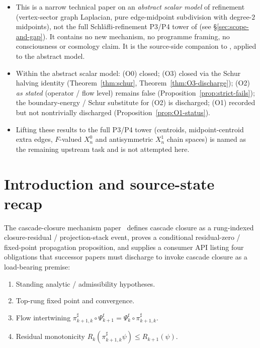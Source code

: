 \documentclass[11pt]{article}
\theoremstyle{plain}
\theoremstyle{definition}
\theoremstyle{remark}
\begin{document}
\begin{tcolorbox}[title=\textbf{Scope}]
\begin{itemize}[leftmargin=*]
\item This is a narrow technical paper on an \emph{abstract scalar
  model} of refinement (vertex-sector graph Laplacian, pure
  edge-midpoint subdivision with degree-$2$ midpoints), not the full
  Schl\"{a}fli-refinement P3/P4 tower of
  \cite{CascadeRefinementSpaces, CascadeClosureDynamics} (see
  \S\ref{sec:scope-and-gap}). It contains no new mechanism, no
  programme framing, no consciousness or cosmology claim. It is the
  source-side companion to \cite{CascadeMechanism}, applied to the
  abstract model.
\item Within the abstract scalar model: (O0) closed; (O3) closed via
  the Schur halving identity (Theorem~\ref{thm:schur},
  Theorem~\ref{thm:O3-discharge}); (O2) \emph{as stated} (operator /
  flow level) remains false (Proposition~\ref{prop:strict-fails});
  the boundary-energy / Schur substitute for (O2) is discharged;
  (O1) recorded but not nontrivially discharged
  (Proposition~\ref{prop:O1-status}).
\item Lifting these results to the full P3/P4 tower (centroids,
  midpoint-centroid extra edges, $F$-valued $X_n^{0}$ and
  antisymmetric $X_n^{1}$ chain spaces) is named as the remaining
  upstream task and is not attempted here.
\end{itemize}
\end{tcolorbox}

\section{Introduction and source-state recap}\label{sec:intro}

The cascade-closure mechanism paper~\cite{CascadeMechanism} defines
cascade closure as a rung-indexed closure-residual / projection-stack
event, proves a conditional residual-zero / fixed-point propagation
proposition, and supplies a consumer API listing four obligations
that successor papers must discharge to invoke cascade closure as a
load-bearing premise:
\begin{enumerate}[leftmargin=2.4em, label=\textup{(O\arabic*)}, start=0, nosep]
\item Standing analytic / admissibility hypotheses.
\item Top-rung fixed point and convergence.
\item Flow intertwining
  $\pi^{\sharp}_{k+1, k} \circ \Psi_{k+1}^{t} = \Psi_k^{t} \circ \pi^{\sharp}_{k+1, k}$.
\item Residual monotonicity
  $R_k(\pi^{\sharp}_{k+1, k} \psi) \le R_{k+1}(\psi)$.
\end{enumerate}
\end{document}
